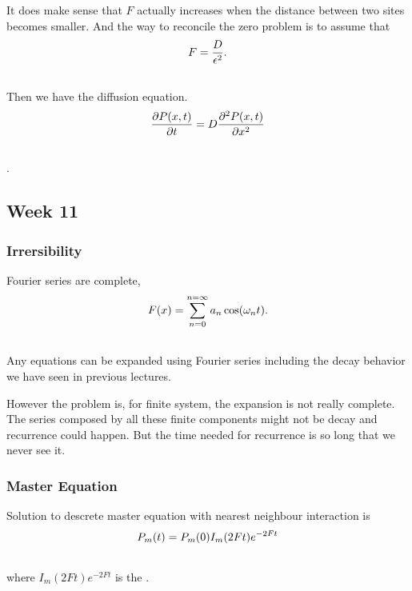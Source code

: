 \documentclass[letterpaper,10pt,english]{sphinxmanual}
\begin{document}
It does make sense that $F$ actually increases when the distance between two sites becomes smaller. And the way to reconcile the zero problem is to assume that
\begin{gather}
\begin{split}F = \frac{D}{\epsilon^2} .\end{split}\notag\\\begin{split}\end{split}\notag
\end{gather}
Then we have the diffusion equation.
\begin{gather}
\begin{split}\frac{\partial P(x,t)}{\partial t} = D\frac{\partial^2 P(x,t)}{\partial x^2}\end{split}\notag\\\begin{split}\end{split}\notag
\end{gather}
.


\subsection{Week 11}
\label{nonequilibrium/week11:week-11}\label{nonequilibrium/week11::doc}

\subsubsection{Irrersibility}
\label{nonequilibrium/week11:irrersibility}\label{nonequilibrium/week11:index-0}
Fourier series are complete,
\begin{gather}
\begin{split}F(x) = \sum_{n=0}^{n=\infty} a_n \cos(\omega_n t) .\end{split}\notag\\\begin{split}\end{split}\notag
\end{gather}
Any equations can be expanded using Fourier series including the decay behavior we have seen in previous lectures.

However the problem is, for finite system, the expansion is not really complete. The series composed by all these finite components might not be decay and recurrence could happen. But the time needed for recurrence is so long that we never see it.


\subsubsection{Master Equation}
\label{nonequilibrium/week11:master-equation}
Solution to descrete master equation with nearest neighbour interaction is
\begin{gather}
\begin{split}P_m(t) = P_m(0)I_m(2Ft)e^{-2Ft}\end{split}\notag\\\begin{split}\end{split}\notag
\end{gather}
where $I_m(2Ft)e^{-2Ft}$ is the .
\end{document}
